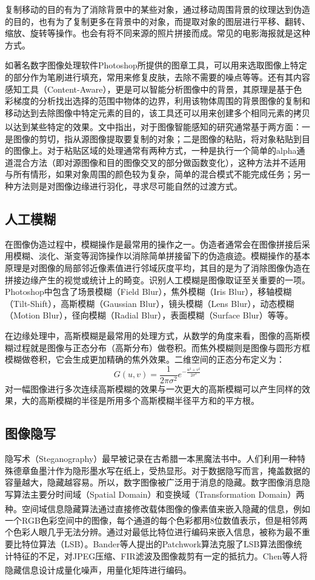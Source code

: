 \documentclass[a4paper, 10pt, notitlepage]{report}
\newcommand{\supercite}[1]{\textsuperscript{\cite{#1}}}
\begin{document}
			复制移动的目的有为了消除背景中的某些对象，通过移动周围背景的纹理达到伪造的目的，也有为了复制更多在背景中的对象，而提取对象的图层进行平移、翻转、缩放、旋转等操作。也会有将不同来源的照片拼接而成。常见的电影海报就是这种方式。

			如著名数字图像处理软件Photoshop所提供的图章工具，可以用来选取图像上特定的部分作为笔刷进行填充，常用来修复皮肤，去除不需要的噪点等等。还有其内容感知工具（Content-Aware），更是可以智能分析图像中的背景，其原理是基于色彩梯度的分析找出选择的范围中物体的边界，利用该物体周围的背景图像的复制和移动达到去除图像中特定元素的目的，该工具还可以用来创建多个相同元素的拷贝以达到某些特定的效果。文\supercite{ding2010content}中指出，对于图像智能感知的研究通常基于两方面：一是图像的剪切，指从源图像提取要复制的对象；二是图像的粘贴，将对象粘贴到目的图像上。对于粘贴区域的处理通常有两种方式，一种是执行一个简单的alpha通道混合方法（即对源图像和目的图像交叉的部分做函数变化），这种方法并不适用与所有情形，如果对象周围的颜色较为复杂，简单的混合模式不能完成任务；另一种方法则是对图像边缘进行羽化，寻求尽可能自然的过渡方式。

		\subsection{人工模糊}
			在图像伪造过程中，模糊操作是最常用的操作之一。伪造者通常会在图像拼接后采用模糊、淡化、渐变等润饰操作以消除简单拼接留下的伪造痕迹。模糊操作的基本原理是对图像的局部邻近像素值进行邻域灰度平均，其目的是为了消除图像伪造在拼接边缘产生的视觉或统计上的畸变。识别人工模糊是图像取证至关重要的一项。Photoshop中包含了场景模糊（Field Blur），焦外模糊（Iris Blur），移轴模糊（Tilt-Shift），高斯模糊（Gaussian Blur），镜头模糊（Lens Blur），动态模糊（Motion Blur），径向模糊（Radial Blur），表面模糊（Surface Blur）等等。

			在边缘处理中，高斯模糊是最常用的处理方式，从数学的角度来看，图像的高斯模糊过程就是图像与正态分布（高斯分布）做卷积。而焦外模糊则是图像与圆形方框模糊做卷积，它会生成更加精确的焦外效果。二维空间的正态分布定义为：
			\begin{equation}
				G(u,v) = \frac{1}{2\pi\sigma^2}e^{-\frac{u^2+v^2}{2\sigma^2}}
			\end{equation}
			对一幅图像进行多次连续高斯模糊的效果与一次更大的高斯模糊可以产生同样的效果，大的高斯模糊的半径是所用多个高斯模糊半径平方和的平方根。

		\subsection{图像隐写}
			隐写术（Steganography）最早被记录在古希腊一本黑魔法书中。人们利用一种特殊德章鱼墨汁作为隐形墨水写在纸上，受热显形。对于数据隐写而言，掩盖数据的容量越大，隐藏越容易。所以，数字图像被广泛用于消息的隐藏。数字图像消息隐写算法主要分时间域（Spatial Domain）和变换域（Transformation Domain）两种\supercite{张亚伟2008图像隐写分析算法研究}。空间域信息隐藏算法通过直接修改载体图像的像素值来嵌入隐藏的信息，例如一个RGB色彩空间中的图像，每个通道的每个色彩都用8位数值表示，但是相邻两个色彩人眼几乎无法分辨。通过对最低比特位进行编码来嵌入信息，被称为最不重要比特位算法（LSB）。Bander等人提出的Patchwork算法克服了LSB算法图像统计特征的不足，对JPEG压缩、FIR滤波及图像裁剪有一定的抵抗力。Chen等人将隐藏信息设计成量化噪声，用量化矩阵进行编码\supercite{chen2006blind}。
\end{document}
